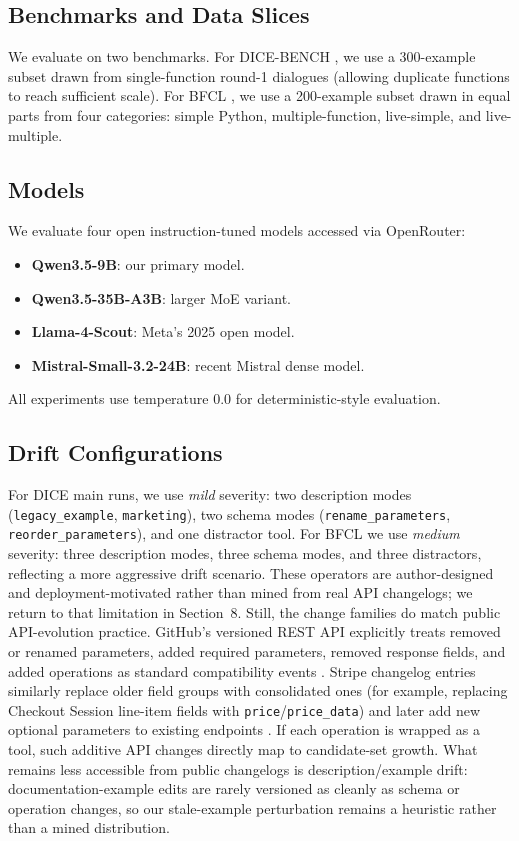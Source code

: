 \documentclass[runningheads]{llncs}
\begin{document}
\subsection{Benchmarks and Data Slices}
We evaluate on two benchmarks. For DICE-BENCH \cite{jang2025dicebench}, we use a
300-example subset drawn from single-function round-1 dialogues (allowing duplicate
functions to reach sufficient scale). For BFCL \cite{bfcl2024}, we use a 200-example
subset drawn in equal parts from four categories: simple Python, multiple-function,
live-simple, and live-multiple.

\subsection{Models}
We evaluate four open instruction-tuned models accessed via OpenRouter:

\begin{itemize}
\item \textbf{Qwen3.5-9B}: our primary model.
\item \textbf{Qwen3.5-35B-A3B}: larger MoE variant.
\item \textbf{Llama-4-Scout}: Meta's 2025 open model.
\item \textbf{Mistral-Small-3.2-24B}: recent Mistral dense model.
\end{itemize}

All experiments use temperature $0.0$ for deterministic-style evaluation.

\subsection{Drift Configurations}
For DICE main runs, we use \emph{mild} severity: two description modes
(\texttt{legacy\_example}, \texttt{marketing}), two schema modes
(\texttt{rename\_parameters}, \texttt{reorder\_parameters}), and one distractor
tool. For BFCL we use \emph{medium} severity: three description modes, three schema
modes, and three distractors, reflecting a more aggressive drift scenario. These
operators are author-designed and deployment-motivated rather than mined from real
API changelogs; we return to that limitation in Section~8. Still, the change
families do match public API-evolution practice. GitHub's versioned REST API
explicitly treats removed or renamed parameters, added required parameters, removed
response fields, and added operations as standard compatibility events
\cite{githubbreaking2026}. Stripe changelog entries similarly replace older field
groups with consolidated ones (for example, replacing Checkout Session line-item
fields with \texttt{price}/\texttt{price\_data}) and later add new optional
parameters to existing endpoints \cite{stripecheckout2022,stripedefaultvalue2025}.
If each operation is wrapped as a tool, such additive API changes directly map to
candidate-set growth. What remains less accessible from public changelogs is
description/example drift: documentation-example edits are rarely versioned as
cleanly as schema or operation changes, so our stale-example perturbation remains a
heuristic rather than a mined distribution.
\end{document}
